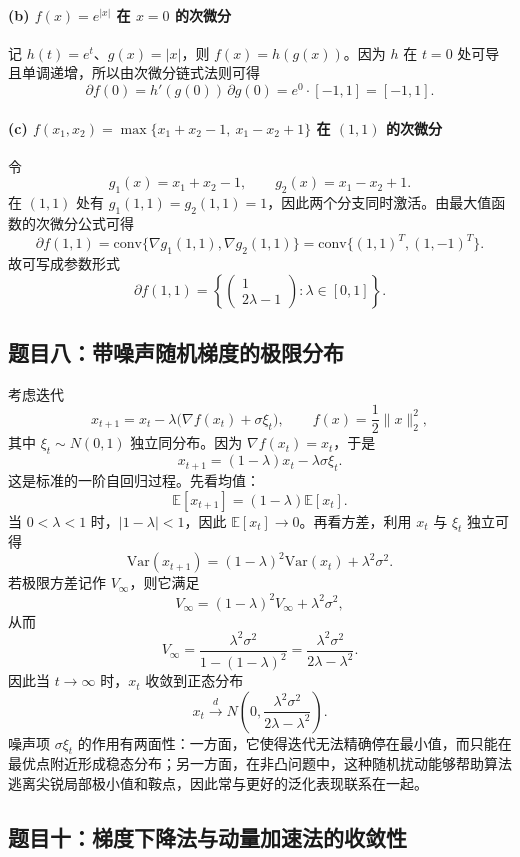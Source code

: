 \documentclass[UTF8,a4paper,12pt,fontset=none]{ctexart}
\begin{document}
\paragraph{(b) $f(x)=e^{|x|}$ 在 $x=0$ 的次微分}
记 $h(t)=e^t$、$g(x)=|x|$，则 $f(x)=h(g(x))$。因为 $h$ 在 $t=0$ 处可导且单调递增，所以由次微分链式法则可得
\[
\partial f(0)=h'(g(0))\,\partial g(0)=e^0\cdot[-1,1]=[-1,1].
\]

\paragraph{(c) $f(x_1,x_2)=\max\{x_1+x_2-1,\ x_1-x_2+1\}$ 在 $(1,1)$ 的次微分}
令
\[
g_1(x)=x_1+x_2-1,\qquad g_2(x)=x_1-x_2+1.
\]
在 $(1,1)$ 处有 $g_1(1,1)=g_2(1,1)=1$，因此两个分支同时激活。由最大值函数的次微分公式可得
\[
\partial f(1,1)=\mathrm{conv}\{\nabla g_1(1,1),\nabla g_2(1,1)\}
=\mathrm{conv}\{(1,1)^T,(1,-1)^T\}.
\]
故可写成参数形式
\[
\partial f(1,1)=\left\{\begin{pmatrix}1\\ 2\lambda-1\end{pmatrix}:\lambda\in[0,1]\right\}.
\]

\subsection{题目八：带噪声随机梯度的极限分布}

考虑迭代
\[
x_{t+1}=x_t-\lambda\bigl(\nabla f(x_t)+\sigma\xi_t\bigr),\qquad f(x)=\frac12\lVert x\rVert_2^2,
\]
其中 $\xi_t\sim N(0,1)$ 独立同分布。因为 $\nabla f(x_t)=x_t$，于是
\[
x_{t+1}=(1-\lambda)x_t-\lambda\sigma\xi_t.
\]
这是标准的一阶自回归过程。先看均值：
\[
\mathbb{E}[x_{t+1}]=(1-\lambda)\mathbb{E}[x_t].
\]
当 $0<\lambda<1$ 时，$|1-\lambda|<1$，因此 $\mathbb{E}[x_t]\to 0$。再看方差，利用 $x_t$ 与 $\xi_t$ 独立可得
\[
\mathrm{Var}(x_{t+1})=(1-\lambda)^2\mathrm{Var}(x_t)+\lambda^2\sigma^2.
\]
若极限方差记作 $V_\infty$，则它满足
\[
V_\infty=(1-\lambda)^2V_\infty+\lambda^2\sigma^2,
\]
从而
\[
V_\infty=\frac{\lambda^2\sigma^2}{1-(1-\lambda)^2}=\frac{\lambda^2\sigma^2}{2\lambda-\lambda^2}.
\]
因此当 $t\to\infty$ 时，$x_t$ 收敛到正态分布
\[
x_t\xrightarrow[]{d}N\left(0,\frac{\lambda^2\sigma^2}{2\lambda-\lambda^2}\right).
\]
噪声项 $\sigma\xi_t$ 的作用有两面性：一方面，它使得迭代无法精确停在最小值，而只能在最优点附近形成稳态分布；另一方面，在非凸问题中，这种随机扰动能够帮助算法逃离尖锐局部极小值和鞍点，因此常与更好的泛化表现联系在一起。

\subsection{题目十：梯度下降法与动量加速法的收敛性}
\end{document}
